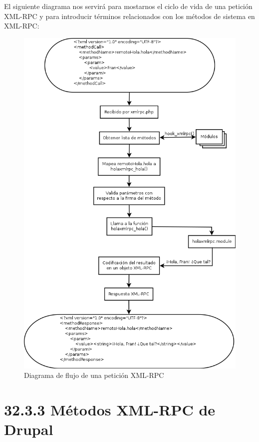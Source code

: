 El siguiente diagrama nos servirá para mostarnos el ciclo de vida de una petición XML-RPC y para introducir términos 
relacionados con los métodos de sistema en XML-RPC:

\begin{figure}
  \centering
    \includegraphics[width=1\textwidth]{Assets/xmlrpc/Imagenes/workflow.png}
  \caption{Diagrama de flujo de una petición XML-RPC}
\end{figure}

\section{\Large{32.3.3 Métodos XML-RPC de Drupal}}

